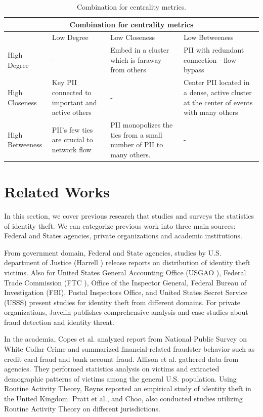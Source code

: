 \documentclass[conference]{IEEEtran}
\begin{document}
\begin{table}[t!]
\centering
\begin{tabular}{ |p{4cm}||p{4cm}|p{4cm}|p{4cm}|  }
 \hline
 \multicolumn{4}{|c|}{Combination for centrality metrics} \\
 \hline
    & Low Degree & Low Closeness & Low Betweeness \\
 \hline
 High Degree   & -    & Embed in a cluster which is faraway from others & PII with redundant connection - flow bypass \\
 \hline
 High Closeness &   Key PII connected to important and active others  & -   & Center PII located  in  a  dense,  active cluster at the center of events with many others \\
 \hline
 High Betweeness & PII's few ties are crucial to network flow &  PII monopolizes
the ties from a small number of PII to many others.  &  - \\
 \hline
\end{tabular}
\caption{Combination for centrality metrics.}
\label{table:2}
\end{table}

\section{Related Works}

In this section, we cover previous research that studies and surveys the statistics of identity theft. We can categorize previous work into three main sources: Federal and States agencies, private organizations and academic institutions.

From government domain, Federal and State agencies, studies by U.S. department of Justice (Harrell \cite{Harrell}) release reports on distribution of identity theft victims. Also for United States General Accounting Office (USGAO \cite{USGAO}), Federal Trade Commission (FTC \cite{FTC}), Office of the Inspector General, Federal Bureau of Investigation (FBI), Postal Inspectors Office, and United States Secret Service (USSS) present studies for identity theft from different domains. For private organizations, Javelin \cite{Pascual} publishes comprehensive analysis and case studies about fraud detection and identity threat.

In the academia, Copes et al. \cite{Copes} analyzed report from National Public Survey on White Collar Crime and summarized financial-related fraudster behavior such as credit card fraud and bank account fraud. Allison et al. \cite{Allison} gathered data from agencies. They performed statistics analysis on victims and extracted demographic patterns of victims among the general U.S. population. Using Routine Activity Theory, Reyns \cite{Reyns} reported an empirical study of identity theft in the United Kingdom. Pratt et al.\cite{Pratt}, and Choo, \cite{Choo} also conducted studies utilizing Routine Activity Theory on different jurisdictions. 
\end{document}
